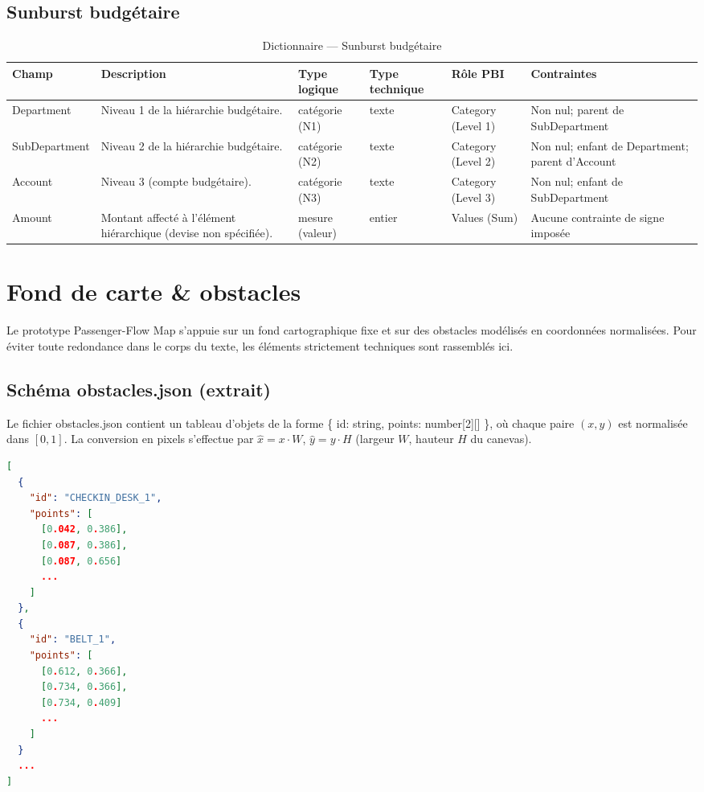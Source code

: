\subsection{Sunburst budgétaire}
\begin{table}[ht]
\small
\setlength{\tabcolsep}{4pt}
\centering
\begin{tabularx}{\linewidth}{l X l l X X}
\toprule
Champ & Description & Type logique & Type technique & Rôle PBI & Contraintes\\
\midrule
Department & Niveau 1 de la hiérarchie budgétaire. & catégorie (N1) & texte & Category (Level 1) & Non nul; parent de SubDepartment \\
SubDepartment & Niveau 2 de la hiérarchie budgétaire. & catégorie (N2) & texte & Category (Level 2) & Non nul; enfant de Department; parent d’Account \\
Account & Niveau 3 (compte budgétaire). & catégorie (N3) & texte & Category (Level 3) & Non nul; enfant de SubDepartment \\
Amount & Montant affecté à l’élément hiérarchique (devise non spécifiée). & mesure (valeur) & entier & Values (Sum) & Aucune contrainte de signe imposée \\
\bottomrule
\end{tabularx}
\caption{Dictionnaire — Sunburst budgétaire}
\label{tab:a1-budget-compact}
\end{table}

\section{Fond de carte \& obstacles}
\label{ann:a2-fond}

Le prototype Passenger-Flow Map s'appuie sur un fond cartographique fixe et sur des obstacles modélisés en coordonnées normalisées. 
Pour éviter toute redondance dans le corps du texte, les éléments strictement techniques sont rassemblés ici.

\subsection{Schéma obstacles.json (extrait)}
Le fichier obstacles.json contient un tableau d'objets de la forme 
\{ id: string, points: number[2][] \}, où chaque paire \((x,y)\) est normalisée dans \([0,1]\). 
La conversion en pixels s'effectue par \(\hat x = x \cdot W\), \(\hat y = y \cdot H\) (largeur \(W\), hauteur \(H\) du canevas).

\begin{lstlisting}[language=json, basicstyle=\ttfamily\small, breaklines=true, breakatwhitespace=true, columns=fullflexible]
[
  {
    "id": "CHECKIN_DESK_1",
    "points": [
      [0.042, 0.386],
      [0.087, 0.386],
      [0.087, 0.656]
      ...
    ]
  },
  {
    "id": "BELT_1",
    "points": [
      [0.612, 0.366],
      [0.734, 0.366],
      [0.734, 0.409]
      ...
    ]
  }
  ...
]
\end{lstlisting}

